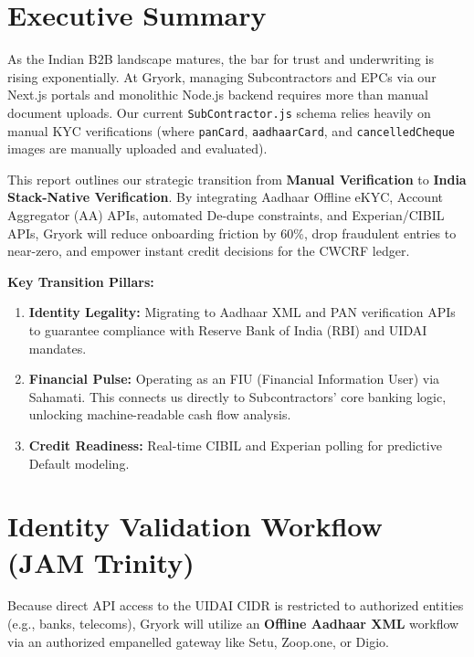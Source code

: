 \documentclass[11pt, a4paper]{report}
\begin{document}
\tableofcontents
\newpage

\chapter{Executive Summary}

As the Indian B2B landscape matures, the bar for trust and underwriting is rising exponentially. At Gryork, managing Subcontractors and EPCs via our Next.js portals and monolithic Node.js backend requires more than manual document uploads. Our current \texttt{SubContractor.js} schema relies heavily on manual KYC verifications (where \texttt{panCard}, \texttt{aadhaarCard}, and \texttt{cancelledCheque} images are manually uploaded and evaluated).

This report outlines our strategic transition from \textbf{Manual Verification} to \textbf{India Stack-Native Verification}. By integrating Aadhaar Offline eKYC, Account Aggregator (AA) APIs, automated De-dupe constraints, and Experian/CIBIL APIs, Gryork will reduce onboarding friction by 60\%, drop fraudulent entries to near-zero, and empower instant credit decisions for the CWCRF ledger. 

\textbf{Key Transition Pillars:}
\begin{enumerate}[label=\textbf{\textcolor{gryorkLightBlue}{\arabic*.}}, itemsep=0.3em]
    \item \textbf{Identity Legality:} Migrating to Aadhaar XML and PAN verification APIs to guarantee compliance with Reserve Bank of India (RBI) and UIDAI mandates.
    \item \textbf{Financial Pulse:} Operating as an FIU (Financial Information User) via Sahamati. This connects us directly to Subcontractors' core banking logic, unlocking machine-readable cash flow analysis.
    \item \textbf{Credit Readiness:} Real-time CIBIL and Experian polling for predictive Default modeling.
\end{enumerate}

\chapter{Identity Validation Workflow (JAM Trinity)}

Because direct API access to the UIDAI CIDR is restricted to authorized entities (e.g., banks, telecoms), Gryork will utilize an \textbf{Offline Aadhaar XML} workflow via an authorized empanelled gateway like Setu, Zoop.one, or Digio.
\end{document}
